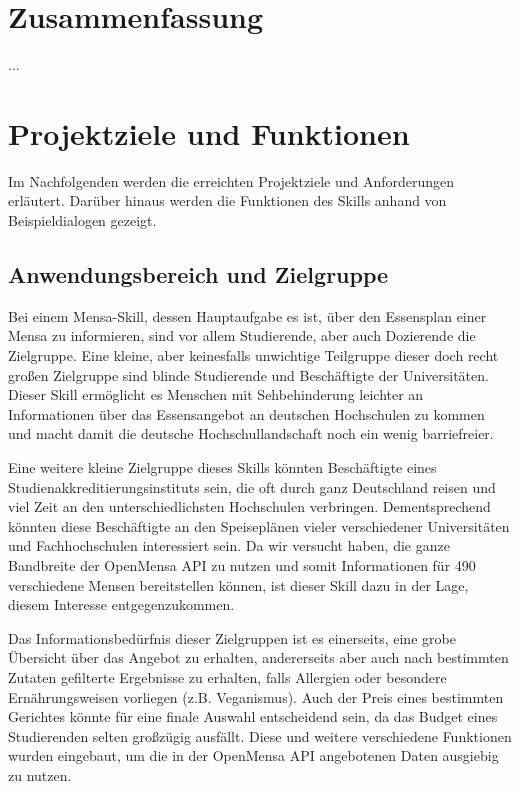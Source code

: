 \documentclass[12pt]{article}
\begin{document}
\tableofcontents
\thispagestyle{empty}
\newpage	

\section{Zusammenfassung}
...
\section{Projektziele und Funktionen}
Im Nachfolgenden werden die erreichten Projektziele und Anforderungen erläutert. 
Darüber hinaus werden die Funktionen des Skills anhand von Beispieldialogen gezeigt.

\subsection{Anwendungsbereich und Zielgruppe}
Bei einem Mensa-Skill, dessen Hauptaufgabe es ist, über den Essensplan einer Mensa zu informieren, sind vor allem Studierende, aber auch Dozierende die Zielgruppe.
Eine kleine, aber keinesfalls unwichtige Teilgruppe dieser doch recht großen Zielgruppe sind blinde Studierende und Beschäftigte der Universitäten.
Dieser Skill ermöglicht es Menschen mit Sehbehinderung leichter an Informationen über das Essensangebot an deutschen Hochschulen zu kommen und macht damit die deutsche Hochschullandschaft noch ein wenig barriefreier.

Eine weitere kleine Zielgruppe dieses Skills könnten Beschäftigte eines Studienakkreditierungsinstituts sein, die oft durch ganz Deutschland reisen und viel Zeit an den unterschiedlichsten Hochschulen verbringen.
Dementsprechend könnten diese Beschäftigte an den Speiseplänen vieler verschiedener Universitäten und Fachhochschulen interessiert sein.
Da wir versucht haben, die ganze Bandbreite der OpenMensa API zu nutzen und somit Informationen für 490 verschiedene Mensen bereitstellen können, ist dieser Skill dazu in der Lage, diesem Interesse entgegenzukommen.

Das Informationsbedürfnis dieser Zielgruppen ist es einerseits, eine grobe Übersicht über das Angebot zu erhalten, andererseits aber auch nach bestimmten Zutaten gefilterte Ergebnisse zu erhalten, falls Allergien oder besondere Ernährungsweisen vorliegen (z.B. Veganismus).
Auch der Preis eines bestimmten Gerichtes könnte für eine finale Auswahl entscheidend sein, da das Budget eines Studierenden selten großzügig ausfällt.
Diese und weitere verschiedene Funktionen wurden eingebaut, um die in der OpenMensa API angebotenen Daten ausgiebig zu nutzen.
\end{document}
